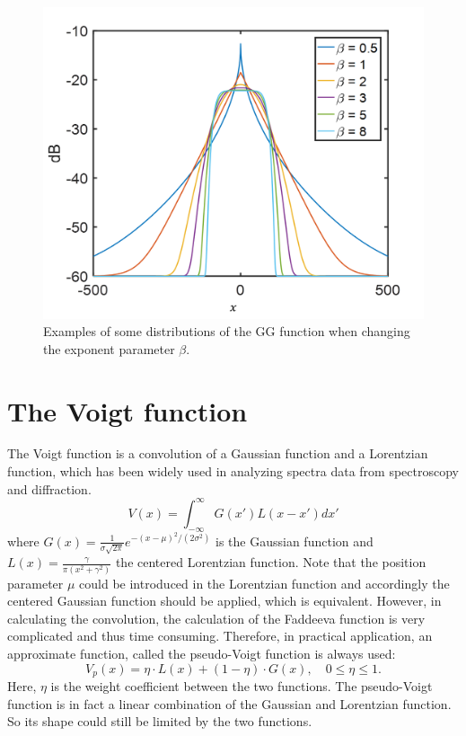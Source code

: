\begin{figure}[h]
\begin{centering}
\includegraphics[scale=0.35]{fig_GGD_plot.png}
\par\end{centering}
\caption{Examples of some distributions of the GG function when changing the exponent parameter $\beta$.}
\label{fig:GGD_plot}
\end{figure}


\section*{The Voigt function}


The Voigt function is a convolution of a Gaussian function and a Lorentzian function, which has been widely used in analyzing spectra data from spectroscopy and diffraction.
\begin{equation}
V(x)= \int_{-\infty}^{\infty} G(x')L(x-x') dx'
\label{eq:VD}
\end{equation}
\noindent where $G(x) = \frac{1}{\sigma\sqrt{2\pi}}e^{-(x-\mu)^2/(2\sigma^2)}$ is the Gaussian function and $L(x) = \frac{\gamma}{\pi(x^2+\gamma^2)}$ the centered Lorentzian function. Note that the position parameter $\mu$ could be introduced in the Lorentzian function and accordingly the centered Gaussian function should be applied, which is equivalent. However, in calculating the convolution, the calculation of the Faddeeva function is very complicated and thus time consuming. Therefore, in practical application, an approximate function, called the pseudo-Voigt function is always used:%
\begin{equation}
V_{p}(x) = \eta \cdot L(x) + (1-\eta) \cdot G(x),\quad 0\leq\eta\leq1.
\label{eq:VD}
\end{equation}
\noindent Here, $\eta$ is the weight coefficient between the two functions. The pseudo-Voigt function is in fact a linear combination of the Gaussian and Lorentzian function. So its shape could still be limited by the two functions. 



